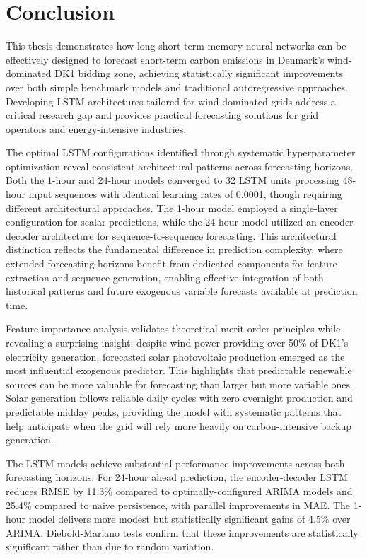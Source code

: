\thispagestyle{plain}
\section{Conclusion}

This thesis demonstrates how long short-term memory neural networks can be effectively designed to forecast short-term carbon emissions in Denmark's wind-dominated DK1 bidding zone, achieving statistically significant improvements over both simple benchmark models and traditional autoregressive approaches. Developing LSTM architectures tailored for wind-dominated grids address a critical research gap and provides practical forecasting solutions for grid operators and energy-intensive industries.

The optimal LSTM configurations identified through systematic hyperparameter optimization reveal consistent architectural patterns across forecasting horizons. Both the 1-hour and 24-hour models converged to 32 LSTM units processing 48-hour input sequences with identical learning rates of 0.0001, though requiring different architectural approaches. The 1-hour model employed a single-layer configuration for scalar predictions, while the 24-hour model utilized an encoder-decoder architecture for sequence-to-sequence forecasting. This architectural distinction reflects the fundamental difference in prediction complexity, where extended forecasting horizons benefit from dedicated components for feature extraction and sequence generation, enabling effective integration of both historical patterns and future exogenous variable forecasts available at prediction time.

Feature importance analysis validates theoretical merit-order principles while revealing a surprising insight: despite wind power providing over 50\% of DK1's electricity generation, forecasted solar photovoltaic production emerged as the most influential exogenous predictor. This highlights that predictable renewable sources can be more valuable for forecasting than larger but more variable ones. Solar generation follows reliable daily cycles with zero overnight production and predictable midday peaks, providing the model with systematic patterns that help anticipate when the grid will rely more heavily on carbon-intensive backup generation.

The LSTM models achieve substantial performance improvements across both forecasting horizons. For 24-hour ahead prediction, the encoder-decoder LSTM reduces RMSE by 11.3\% compared to optimally-configured ARIMA models and 25.4\% compared to naive persistence, with parallel improvements in MAE. The 1-hour model delivers more modest but statistically significant gains of 4.5\% over ARIMA. Diebold-Mariano tests confirm that these improvements are statistically significant rather than due to random variation.

